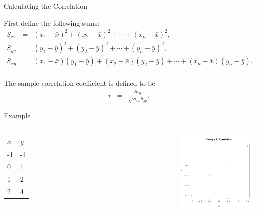 \begin{frame}{Calculating the Correlation}

  First define the following sums:
  \begin{eqnarray*}
    S_{xx} & = & (x_1-\bar{x})^2 + (x_2-\bar{x})^2 + \cdots + (x_n-\bar{x})^2, \\
    S_{yy} & = & (y_1-\bar{y})^2 + (y_2-\bar{y})^2 + \cdots + (y_n-\bar{y})^2, \\
    S_{xy} & = & (x_1-\bar{x})(y_1-\bar{y}) + (x_2-\bar{x})(y_2-\bar{y}) + \cdots + (x_n-\bar{x})(y_n-\bar{y}). \\
  \end{eqnarray*}

  {
    
    \begin{definition}
      The sample correlation coefficient is defined to be
      \begin{eqnarray*}
        r & = & \frac{S_{xy}}{\sqrt{S_{xx} S_{yy}}}.
      \end{eqnarray*}
    \end{definition}

  }
  
\end{frame}



\begin{frame}{Example}
  
  \begin{columns}
    \begin{tabular}{l|l}
      $x$ & $y$ \\ \hline
      -1 & -1 \\
      0 & 1 \\
      1 & 2 \\
      2 & 4
    \end{tabular}

    
    {
      \centerline{\includegraphics[width=6cm]{img/week2-Day3Correlation}}
    }

    \end{columns}

\end{frame}


